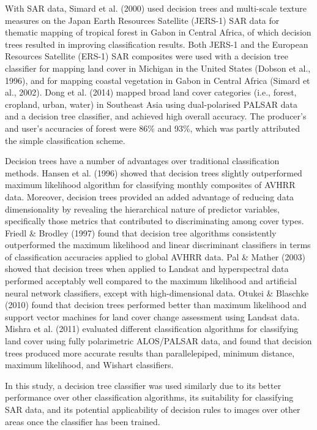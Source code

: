 With SAR data, Simard et al. (2000) used decision trees and multi-scale texture measures on the Japan Earth Resources Satellite (JERS-1) SAR data for thematic mapping of tropical forest in Gabon in Central Africa, of which decision trees resulted in improving classification results. Both JERS-1 and the European Resources Satellite (ERS-1) SAR composites were used with a decision tree classifier for mapping land cover in Michigan in the United States (Dobson et al., 1996), and for mapping coastal vegetation in Gabon in Central Africa (Simard et al., 2002). Dong et al. (2014) mapped broad land cover categories (i.e., forest, cropland, urban, water) in Southeast Asia using dual-polarised PALSAR data and a decision tree classifier, and achieved high overall accuracy. The producer's and user's accuracies of forest were 86\% and 93\%, which was partly attributed the simple classification scheme.

Decision trees have a number of advantages over traditional classification methods. Hansen et al. (1996) showed that decision trees slightly outperformed maximum likelihood algorithm for classifying monthly composites of AVHRR data. Moreover, decision trees provided an added advantage of reducing data dimensionality by revealing the hierarchical nature of predictor variables, specifically those metrics that contributed to discriminating among cover types. Friedl \& Brodley (1997) found that decision tree algorithms consistently outperformed the maximum likelihood and linear discriminant classifiers in terms of classification accuracies applied to global AVHRR data. Pal \& Mather (2003) showed that decision trees when applied to Landsat and hyperspectral data performed acceptably well compared to the maximum likelihood and artificial neural network classifiers, except with high-dimensional data. Otukei \& Blaschke (2010) found that decision trees performed better than maximum likelihood and support vector machines for land cover change assessment using Landsat data. Mishra et al. (2011) evaluated different classification algorithms for classifying land cover using fully polarimetric ALOS/PALSAR data, and found that decision trees produced more accurate results than parallelepiped, minimum distance, maximum likelihood, and Wishart classifiers.

In this study, a decision tree classifier was used similarly due to its better performance over other classification algorithms, its suitability for classifying SAR data, and its potential applicability of decision rules to images over other areas once the classifier has been trained.

